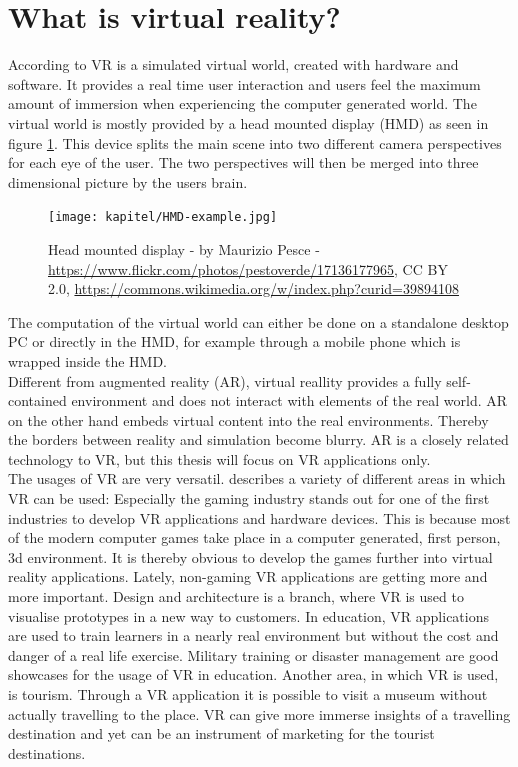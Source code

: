 \section{What is virtual reality?}
According to \cite{Fuchs.2011} VR is a simulated virtual world, created with hardware and software. It provides a real time user interaction and users feel the maximum amount of immersion when experiencing the computer generated world. The virtual world is mostly provided by a head mounted display (HMD) as seen in figure \ref{fig:hmd}. This device splits the main scene into two different camera perspectives for each eye of the user. The two perspectives will then be merged into three dimensional picture by the users brain. \\
\begin{figure}[h!]
  \texttt{[image: kapitel/HMD-example.jpg]}
  \centering
  \caption{Head mounted display - by Maurizio Pesce -  \url{https://www.flickr.com/photos/pestoverde/17136177965}, CC BY 2.0, \url{https://commons.wikimedia.org/w/index.php?curid=39894108}
}
  \label{fig:hmd}
\end{figure}
The computation of the virtual world can either be done on a standalone desktop PC or directly in the HMD, for example through a mobile phone which is wrapped inside the HMD.\\
Different from augmented reality (AR), virtual reallity provides a fully self-contained environment and does not interact with elements of the real world. AR on the other hand embeds virtual content into the real environments. Thereby the borders between reality and simulation become blurry. AR is a closely related technology to VR, but this thesis will focus on VR applications only.\\
The usages of VR are very versatil. \cite{Linowes.2015} describes a variety of different areas in which VR can be used: Especially the gaming industry stands out for one of the first industries to develop VR applications and hardware devices. This is because most of the modern computer games take place in a computer generated, first person, 3d environment. It is thereby obvious to develop the games further into virtual reality applications. Lately, non-gaming VR applications are getting more and more important. Design and architecture is a branch, where VR is used to visualise prototypes in a new way to customers. In education, VR applications are used to train learners in a nearly real environment but without the cost and danger of a real life exercise. Military training or disaster management are good showcases for the usage of VR in education. Another area, in which VR is used, is tourism. Through a VR application it is possible to visit a museum without actually travelling to the place. VR can give more immerse insights of a travelling destination and yet can be an instrument of marketing for the tourist destinations.
